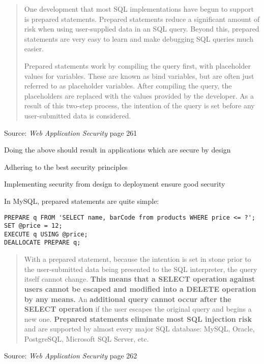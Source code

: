 \documentclass[Screen16to9,17pt]{foils}
\begin{document}

\begin{quote}
One development that most SQL implementations have begun to support is prepared statements. Prepared statements reduce a significant amount of risk when using user-supplied data in an SQL query. Beyond this, prepared statements are very easy to learn and make debugging SQL queries much easier.

Prepared statements work by compiling the query first, with placeholder values for variables. These are known as bind variables, but are often just referred to as placeholder variables. After compiling the query, the placeholders are replaced with the values provided by the developer. As a result of this two-step process, the intention of the query is set before any user-submitted data is considered.
\end{quote}
Source: \emph{Web Application Security} page 261

\begin{list2}
\item Doing the above should result in applications which are secure by design
\item Adhering to the best security principles
\item Implementing security from design to deployment ensure good security
\end{list2}


In MySQL, prepared statements are quite simple:
\begin{verbatim}
PREPARE q FROM 'SELECT name, barCode from products WHERE price <= ?';
SET @price = 12;
EXECUTE q USING @price;
DEALLOCATE PREPARE q;
\end{verbatim}

\begin{quote}
With a prepared statement, because the intention is set in stone prior to the user-submitted data being presented to the SQL interpreter, the query itself cannot change. {\bf This means that a SELECT operation against users cannot be escaped and modified into a DELETE operation by any means.} An {\bf additional query cannot occur after the SELECT operation} if the user escapes the original query and begins a new one. {\bf Prepared statements eliminate most SQL injection risk} and are supported by almost every major SQL database: MySQL, Oracle, PostgreSQL, Microsoft SQL Server, etc.
\end{quote}
Source: \emph{Web Application Security} page 262
\end{document}
